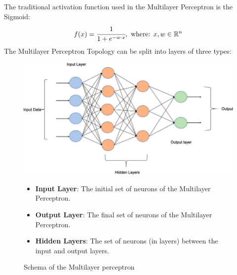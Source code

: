 \documentclass[a4paper, 11pt]{article}
\begin{document}
The traditional activation function used in the Multilayer Perceptron is the Sigmoid: 
\begin{equation*}
f(x) = \cfrac{1}{1+e^{-w\cdot x}},\text{ where: } x,w\in\mathbb{R}^n
\end{equation*}
The Multilayer Perceptron Topology can be split into layers of three types:
\begin{figure}[h]
    \begin{minipage}{9cm}
        \includegraphics[width = 1 \textwidth]{Neural_Network/Multi-layer-perceptron-MLP-NN-basic-Architecture.png}
        \caption{Schema of the Multilayer perceptron}
    \end{minipage}
    \hspace{1em}
    \begin{minipage}{5cm}
        \begin{itemize}
            \item \textbf{Input Layer}: The initial set of neurons of the Multilayer Perceptron.
            \item \textbf{Output Layer}: The final set of neurons of the Multilayer Perceptron.
            \item \textbf{Hidden Layers}: The set of neurons (in layers) between the input and output layers.
        \end{itemize}
    \end{minipage}
\end{figure}\\
\newpage






\end{document}

